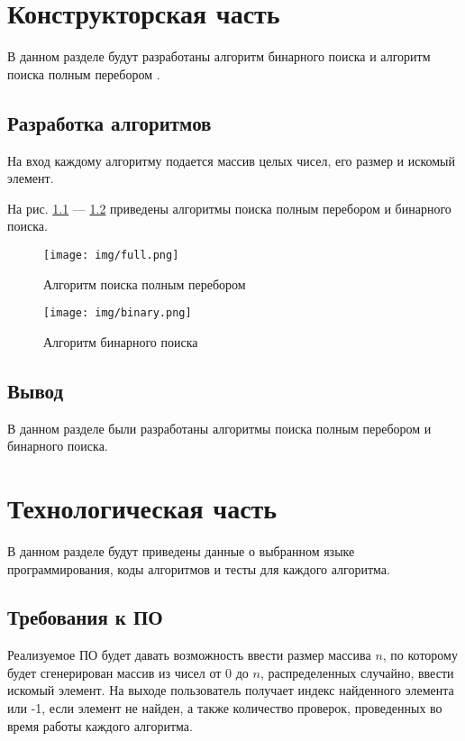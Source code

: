 \documentclass{bmstu}
\begin{document}
\chapter{Конструкторская часть}
В данном разделе будут разработаны алгоритм бинарного поиска и алгоритм поиска полным перебором .

\section{Разработка алгоритмов}

На вход каждому алгоритму подается массив целых чисел, его размер и искомый элемент.

На рис. \ref{fig:full} --- \ref{fig:bin} приведены алгоритмы поиска полным перебором и бинарного поиска.

\clearpage

\begin{figure}[h]
	\centering
 \vspace{0pt}
	\texttt{[image: img/full.png]}
	\caption{Алгоритм поиска полным перебором}
	\label{fig:full}
\end{figure}

\clearpage

\begin{figure}[h]
	\centering
        \vspace{0pt}
	\texttt{[image: img/binary.png]}
	\caption{Алгоритм бинарного поиска}
        \vspace*{3in}
	\label{fig:bin}
\end{figure}
\clearpage

\section*{Вывод}
В данном разделе были разработаны алгоритмы поиска полным перебором и бинарного поиска.

\clearpage

\chapter{Технологическая часть}

В данном разделе будут приведены данные о выбранном языке программирования, коды алгоритмов и тесты для каждого алгоритма.

\section{Требования к ПО}
Реализуемое ПО будет давать возможность ввести размер массива $n$, по которому будет сгенерирован массив из чисел от 0 до $n$, распределенных случайно, ввести искомый элемент. На выходе пользователь получает индекс найденного элемента или -1, если элемент не найден, а также количество проверок, проведенных во время работы каждого алгоритма.
\end{document}
